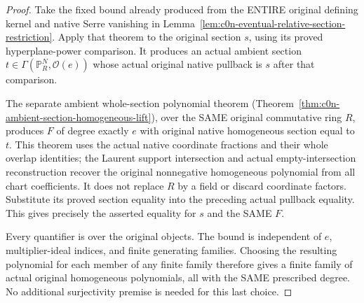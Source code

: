 \begin{proof}
Take the fixed bound already produced from the ENTIRE original defining
kernel and native Serre vanishing in
Lemma~\ref{lem:c0n-eventual-relative-section-restriction}. Apply that theorem
to the original section $s$, using its proved hyperplane-power comparison.
It produces an actual ambient section
$t\in\Gamma(\mathbb P_R^N,\mathcal O(e))$ whose actual original native
pullback is $s$ after that comparison.

The separate ambient whole-section polynomial theorem
(Theorem~\ref{thm:c0n-ambient-section-homogeneous-lift}), over the SAME
original commutative ring $R$, produces $F$ of degree exactly $e$ with
original native homogeneous section equal to $t$. This theorem uses the
actual native coordinate fractions and their whole overlap identities;
the Laurent support intersection and actual empty-intersection
reconstruction recover the original nonnegative homogeneous polynomial
from all chart coefficients. It does not replace
$R$ by a field or discard coordinate factors. Substitute its proved section
equality into the preceding actual pullback equality. This gives precisely
the asserted equality for $s$ and the SAME $F$.

Every quantifier is over the original objects. The bound is independent
of $e$, multiplier-ideal indices, and finite generating families. Choosing
the resulting polynomial for each member of any finite family therefore
gives a finite family of actual original homogeneous polynomials, all with
the SAME prescribed degree. No additional surjectivity premise is needed
for this last choice.
\end{proof}
